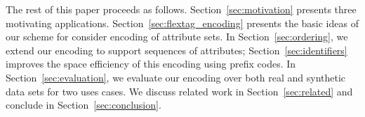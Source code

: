 The rest of this paper proceeds as
follows. Section~\ref{sec:motivation} presents three motivating
applications. Section~\ref{sec:flextag_encoding} presents the basic
ideas of our scheme for consider encoding of attribute sets. In
Section~\ref{sec:ordering}, we extend our encoding to support sequences
of attributes; Section~\ref{sec:identifiers} improves the space
efficiency of this encoding using prefix codes. In
Section~\ref{sec:evaluation}, we evaluate our encoding over both real
and synthetic data sets for two uses cases. We discuss related work in
Section~\ref{sec:related} and conclude in
Section~\ref{sec:conclusion}.


%

